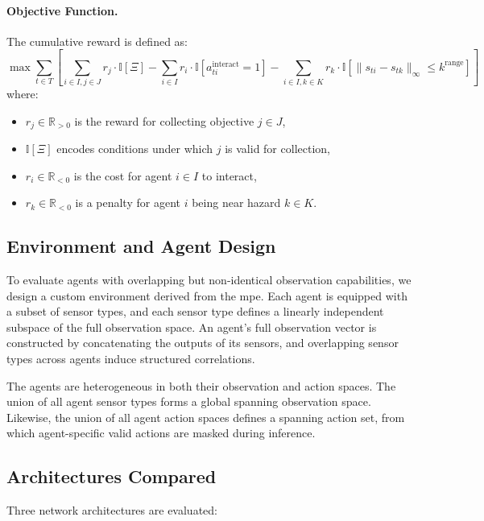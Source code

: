 \documentclass{article}
\begin{document}
\paragraph{Objective Function.} 
The cumulative reward is defined as:
\[
    \max \sum_{t \in T} \left[
        \sum_{i \in I, j \in J} r_j \cdot \mathbb{I}[\Xi]
        - \sum_{i \in I} r_i \cdot \mathbb{I}[a_{ti}^\text{interact} = 1]
        - \sum_{i \in I, k \in K} r_k \cdot \mathbb{I}[\|s_{ti} - s_{tk}\|_\infty \leq k^\text{range}]
    \right]
\]
where:
\begin{itemize}
    \item \(r_j \in \mathbb{R}_{>0}\) is the reward for collecting objective \(j \in J\),
    \item \(\mathbb{I}[\Xi]\) encodes conditions under which \(j\) is valid for collection,
    \item \(r_i \in \mathbb{R}_{<0}\) is the cost for agent \(i \in I\) to interact,
    \item \(r_k \in \mathbb{R}_{<0}\) is a penalty for agent \(i\) being near hazard \(k \in K\).
\end{itemize}






\subsection{Environment and Agent Design}

To evaluate agents with overlapping but non-identical observation capabilities, 
we design a custom environment derived from the \gls{mpe}. 
Each agent is equipped with a subset of sensor types, 
and each sensor type defines a linearly independent subspace of the 
full observation space. An agent's full observation vector is constructed by 
concatenating the outputs of its sensors, and overlapping sensor types across 
agents induce structured correlations.

The agents are heterogeneous in both their observation and action spaces. 
The union of all agent sensor types forms a global spanning observation space. 
Likewise, the union of all agent action spaces defines a spanning action set, 
from which agent-specific valid actions are masked during inference.

\subsection{Architectures Compared}
Three network architectures are evaluated:
\end{document}
